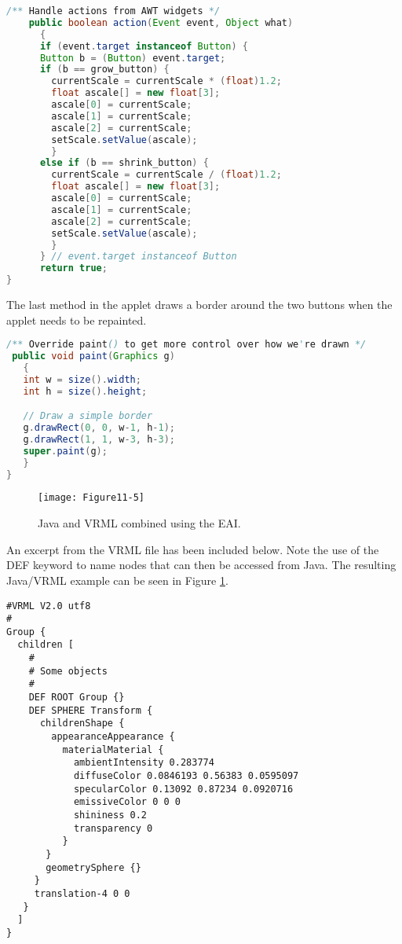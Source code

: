 \begin{lstlisting}[language=Java, caption={}, numbers=none, frame=none]
/** Handle actions from AWT widgets */
    public boolean action(Event event, Object what)
      {
      if (event.target instanceof Button) {
      Button b = (Button) event.target;
      if (b == grow_button) {
        currentScale = currentScale * (float)1.2;
        float ascale[] = new float[3];
        ascale[0] = currentScale;
        ascale[1] = currentScale;
        ascale[2] = currentScale;
        setScale.setValue(ascale);
        }
      else if (b == shrink_button) {
        currentScale = currentScale / (float)1.2;
        float ascale[] = new float[3];
        ascale[0] = currentScale;
        ascale[1] = currentScale;
        ascale[2] = currentScale;
        setScale.setValue(ascale);
        }
      } // event.target instanceof Button
      return true;
}
\end{lstlisting}

The last method in the applet draws a border around the two buttons when the applet needs to be repainted.

\begin{lstlisting}[language=Java, caption={}, numbers=none, frame=none]
/** Override paint() to get more control over how we're drawn */
 public void paint(Graphics g)
   {
   int w = size().width;
   int h = size().height;

   // Draw a simple border
   g.drawRect(0, 0, w-1, h-1);
   g.drawRect(1, 1, w-3, h-3);
   super.paint(g);
   }
}
\end{lstlisting}

\begin{figure}[!htb]
  \centering
  \texttt{[image: Figure11-5]}\\
  \caption{ Java and VRML combined using the EAI.}\label{fig:Figure11-5}
\end{figure}

An excerpt from the VRML file has been included below. Note the use of the DEF keyword to name nodes that can then be accessed from Java. The resulting Java/VRML example can be seen in Figure \ref{fig:Figure11-5}.

\begin{lstlisting}[language=VRML, caption={}, numbers=none, frame=none]
#VRML V2.0 utf8
#
Group {
  children [ 
    #
    # Some objects
    #
    DEF ROOT Group {}
    DEF SPHERE Transform {
      childrenShape {
        appearanceAppearance {
          materialMaterial {
            ambientIntensity 0.283774
            diffuseColor 0.0846193 0.56383 0.0595097
            specularColor 0.13092 0.87234 0.0920716
            emissiveColor 0 0 0
            shininess 0.2
            transparency 0
          }
       }
       geometrySphere {}
     }
     translation-4 0 0
   }
  ]
}
\end{lstlisting}


